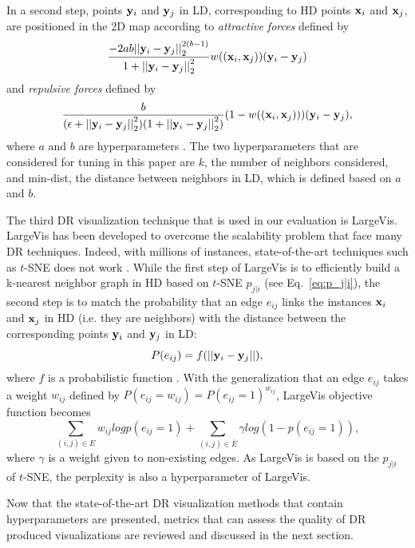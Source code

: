 In a second step, points ${\bf y}_i$ and ${\bf y}_j$ in LD, corresponding to HD points ${\bf x}_i$ and ${\bf x}_j$, are positioned in the 2D map according to \textit{attractive forces} defined by
\begin{equation}
    \frac{-2ab{||{\bf y}_i - {\bf y}_j||}^{2(b-1)}_2}{1+{||{\bf y}_i - {\bf y}_j||}^2_2}w(({\bf x}_i, {\bf x}_j))({\bf y}_i - {\bf y}_j)
\end{equation}
and \textit{repulsive forces} defined by
\begin{equation}
    \frac{b}{(\epsilon+{||{\bf y}_i - {\bf y}_j||}^2_2)(1+{||{\bf y}_i - {\bf y}_j||}^2_2)}(1-w(({\bf x}_i, {\bf x}_j)))({\bf y}_i - {\bf y}_j),
\end{equation}
where $a$ and $b$ are hyperparameters \cite{mcinnes2018umap}. The two hyperparameters that are considered for tuning in this paper are $k$, the number of neighbors considered, and min-dist, the distance between neighbors in LD, which is defined based on $a$ and $b$. 

The third DR visualization technique that is used in our evaluation is LargeVis. LargeVis has been developed to overcome the scalability problem that face many DR techniques. Indeed, with millions of instances, state-of-the-art techniques such as $t$-SNE does not work \cite{tang2016visualizing}. While the first step of LargeVis is to efficiently build a k-nearest neighbor graph in HD based on $t$-SNE $p_{j|i}$ (see Eq.~\ref{eq:p_j|i}), the second step is to match the probability that an edge $e_{ij}$ links the instances ${\bf x}_i$ and ${\bf x}_j$ in HD (i.e. they are neighbors) with the distance between the corresponding points ${\bf y}_i$ and ${\bf y}_j$ in LD:
\begin{equation}
    P(e_{ij}) = f(||{\bf y}_i - {\bf y}_j||),
\end{equation}
where $f$ is a probabilistic function \cite{tang2016visualizing}. With the generalization that an edge $e_{ij}$ takes a weight $w_{ij}$ defined by $P(e_{ij} = w_{ij}) = P(e_{ij} = 1)^{w_{ij}}$, LargeVis objective function becomes
\begin{equation}
    \sum_{(i,j) \in E} w_{ij}logp(e_{ij} = 1) + \sum_{(i,j) \in \bar{E}} \gamma log(1 - p(e_{ij} = 1)),
\end{equation}
where $\gamma$ is a weight given to non-existing edges. As LargeVis is based on the $p_{j|i}$ of $t$-SNE, the perplexity is also a hyperparameter of LargeVis.

Now that the state-of-the-art DR visualization methods that contain hyperparameters are presented, metrics that can assess the quality of DR produced visualizations are reviewed and discussed in the next section.


